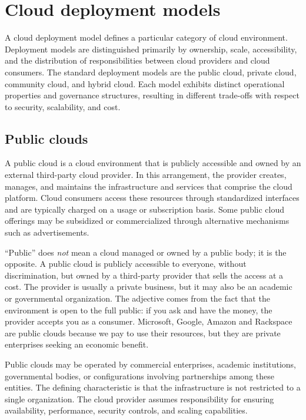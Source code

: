 \section{Cloud deployment models}

A cloud deployment model defines a particular category of cloud environment. Deployment models are distinguished primarily by ownership, scale, accessibility, and the distribution of responsibilities between cloud providers and cloud consumers. The standard deployment models are the public cloud, private cloud, community cloud, and hybrid cloud. Each model exhibits distinct operational properties and governance structures, resulting in different trade-offs with respect to security, scalability, and cost.

\subsection{Public clouds}

A public cloud is a cloud environment that is publicly accessible and owned by an external third-party cloud provider. In this arrangement, the provider creates, manages, and maintains the infrastructure and services that comprise the cloud platform. Cloud consumers access these resources through standardized interfaces and are typically charged on a usage or subscription basis. Some public cloud offerings may be subsidized or commercialized through alternative mechanisms such as advertisements.

\begin{notebox}
	``Public'' does \emph{not} mean a cloud managed or owned by a public body; it is the opposite. A public cloud is publicly accessible to everyone, without discrimination, but owned by a third-party provider that sells the access at a cost. The provider is usually a private business, but it may also be an academic or governmental organization. The adjective comes from the fact that the environment is open to the full public: if you ask and have the money, the provider accepts you as a consumer. Microsoft, Google, Amazon and Rackspace are public clouds because we pay to use their resources, but they are private enterprises seeking an economic benefit.
\end{notebox}


Public clouds may be operated by commercial enterprises, academic institutions, governmental bodies, or configurations involving partnerships among these entities. The defining characteristic is that the infrastructure is not restricted to a single organization. The cloud provider assumes responsibility for ensuring availability, performance, security controls, and scaling capabilities.

